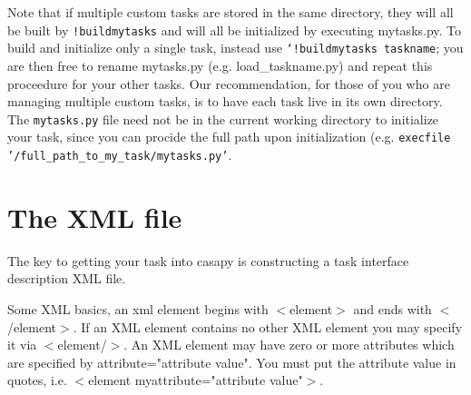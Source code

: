 Note that if multiple custom tasks are stored in the same directory,
they will all be built by {\tt !buildmytasks} and will all be initialized by executing mytasks.py.
To build and initialize only a single task, instead use {\tt `!buildmytasks taskname}; you are then free 
to rename mytasks.py (e.g. load\_taskname.py) and repeat this proceedure for your other tasks.  
Our recommendation, for those of you who are managing multiple custom tasks, is to have each task live in its own directory.
The {\tt mytasks.py} file need not be in the current working directory to initialize your task, since you can procide the
full path upon initialization (e.g. {\tt execfile '/full\_path\_to\_my\_task/mytasks.py'}.






\section{The XML file}
\label{section:write.xml}

The key to getting your task into casapy is constructing a task
interface description XML file.

Some XML basics, an xml element begins with $<$element$>$ and ends
with $<$/element$>$. If an XML element contains no other XML element
you may specify it via $<$element/$>$. An XML element may have zero or
more attributes which are specified by attribute="attribute
value". You must put the attribute value in quotes, i.e. $<$element
myattribute="attribute value"$>$.

